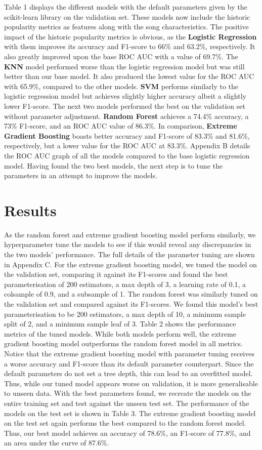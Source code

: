 \documentclass{article}
\begin{document}
Table 1 displays the different models with the default parameters given by the scikit-learn library on the validation set. These models now include the historic popularity metrics as features along with the song characteristics. The positive impact of the historic popularity metrics is obvious, as the \textbf{Logistic Regression} with them improves its accuracy and F1-score to 66\% and 63.2\%, respectively. It also greatly improved upon the base ROC AUC with a value of 69.7\%. The \textbf{KNN} model performed worse than the logistic regression model but was still better than our base model. It also produced the lowest value for the ROC AUC with 65.9\%, compared to the other models. \textbf{SVM} performs similarly to the logistic regression model but achieves slightly higher accuracy albeit a slightly lower F1-score. The next two models performed the best on the validation set without parameter adjustment. \textbf{Random Forest} achieves a 74.4\% accuracy, a 73\% F1-score, and an ROC AUC value of 86.3\%. In comparison, \textbf{Extreme Gradient Boosting} boasts better accuracy and F1-score of 83.3\% and 81.6\%, respectively, but a lower value for the ROC AUC at 83.3\%. Appendix B details the ROC AUC graph of all the models compared to the base logistic regression model. Having found the two best models, the next step is to tune the parameters in an attempt to improve the models.



\section{Results}
As the random forest and extreme gradient boosting model perform similarly, we hyperparameter tune the models to see if this would reveal any discrepancies in the two models’ performance. The full details of the parameter tuning are shown in Appendix C. For the extreme gradient boosting model, we tuned the model on the validation set, comparing it against its F1-scores and found the best parameterisation of 200 estimators, a max depth of 3, a learning rate of 0.1, a colsample of 0.9, and a subsample of 1. The random forest was similarly tuned on the validation set and compared against its F1-scores. We found this model's best parameterisation to be 200 estimators, a max depth of 10, a minimum sample split of 2, and a minimum sample leaf of 3. Table 2 shows the performance metrics of the tuned models. While both models perform well, the extreme gradient boosting model outperforms the random forest model in all metrics. Notice that the extreme gradient boosting model with parameter tuning receives a worse accuracy and F1-score than its default parameter counterpart. Since the default parameters do not set a tree depth, this can lead to an overfitted model. Thus, while our tuned model appears worse on validation, it is more generalisable to unseen data. With the best parameters found, we recreate the models on the entire training set and test against the unseen test set. The performance of the models on the test set is shown in Table 3. The extreme gradient boosting model on the test set again performs the best compared to the random forest model. Thus, our best model achieves an accuracy of 78.6\%, an F1-score of 77.8\%, and an area under the curve of 87.6\%.  
\end{document}
